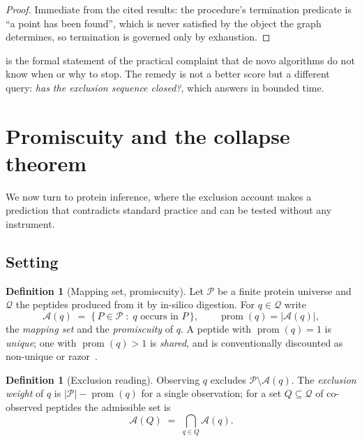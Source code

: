 \documentclass[11pt,a4paper]{article}
\theoremstyle{definition}
\newtheorem{definition}[theorem]{Definition}
\theoremstyle{remark}
\newcommand{\Prot}{\mathcal{P}}              %
\newcommand{\Pep}{\mathcal{Q}}               %
\newcommand{\amb}{\mathcal{A}}               %
\DeclareMathOperator{\prom}{prom}
\begin{document}
\begin{proof}
Immediate from the cited results: the procedure's termination predicate
is ``a point has been found'', which is never satisfied by the object the
graph determines, so termination is governed only by exhaustion.
\end{proof}

 is the formal statement of the practical complaint
that de novo algorithms do not know when or why to stop. The remedy is
not a better score but a different query: \emph{has the exclusion
sequence closed?}, which  answers in bounded time.

\section{Promiscuity and the collapse theorem}
\label{sec:promiscuity}

We now turn to protein inference, where the exclusion account makes a
prediction that contradicts standard practice and can be tested without
any instrument.

\subsection{Setting}

\begin{definition}[Mapping set, promiscuity]
\label{def:mapping}
Let $\Prot$ be a finite protein universe and $\Pep$ the peptides produced
from it by in-silico digestion. For $q\in\Pep$ write
\[
  \amb(q)\;=\;\{\,P\in\Prot \;:\; q \text{ occurs in } P \,\},
  \qquad
  \prom(q)=|\amb(q)| ,
\]
the \emph{mapping set} and the \emph{promiscuity} of $q$. A peptide with
$\prom(q)=1$ is \emph{unique}; one with $\prom(q)>1$ is
\emph{shared}, and is conventionally discounted as non-unique or
razor~\citep{nesvizhskii2005interpretation}.
\end{definition}

\begin{definition}[Exclusion reading]
\label{def:exclusion-reading}
Observing $q$ excludes $\Prot\setminus\amb(q)$. The \emph{exclusion
weight} of $q$ is $|\Prot|-\prom(q)$ for a single observation; for a
set $Q\subseteq\Pep$ of co-observed peptides the admissible set is
\[
  \amb(Q)\;=\;\bigcap_{q\in Q}\amb(q).
\]
\end{definition}
\end{document}

